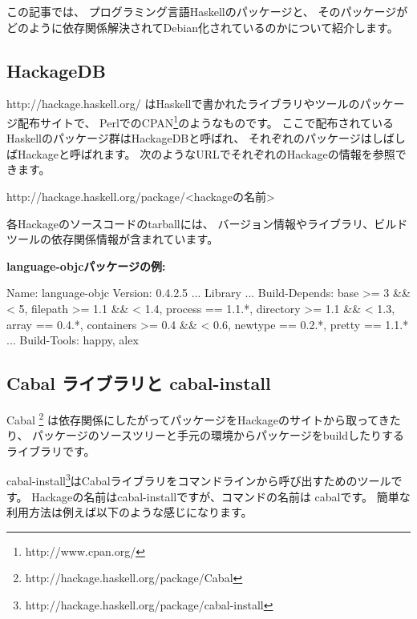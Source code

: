 この記事では、
プログラミング言語Haskellのパッケージと、
そのパッケージがどのように依存関係解決されてDebian化されているのかについて紹介します。


\subsection{HackageDB}

http://hackage.haskell.org/
はHaskellで書かれたライブラリやツールのパッケージ配布サイトで、
PerlでのCPAN{\footnote{http://www.cpan.org/}}のようなものです。
ここで配布されているHaskellのパッケージ群はHackageDBと呼ばれ、
それぞれのパッケージはしばしばHackageと呼ばれます。
次のようなURLでそれぞれのHackageの情報を参照できます。

\begin{commandline}
http://hackage.haskell.org/package/<hackageの名前>
\end{commandline}

各Hackageのソースコードのtarballには、
バージョン情報やライブラリ、ビルドツールの依存関係情報が含まれています。

{\bf language-objcパッケージの例:}

\begin{commandline}
Name:          language-objc
Version:       0.4.2.5
...
Library
...
    Build-Depends: base       >= 3 && < 5,
                   filepath   >= 1.1 && < 1.4,
                   process    == 1.1.*,
                   directory  >= 1.1 && < 1.3,
                   array      == 0.4.*,
                   containers >= 0.4     && < 0.6,
                   newtype    == 0.2.*,
                   pretty     == 1.1.*
...
    Build-Tools:    happy, alex
\end{commandline}

\subsection{Cabal ライブラリと cabal-install}

Cabal \footnote{http://hackage.haskell.org/package/Cabal} は依存関係にしたがってパッケージをHackageのサイトから取ってきたり、
パッケージのソースツリーと手元の環境からパッケージをbuildしたりするライブラリです。

cabal-install\footnote{http://hackage.haskell.org/package/cabal-install}はCabalライブラリをコマンドラインから呼び出すためのツールです。
Hackageの名前はcabal-installですが、コマンドの名前は cabalです。
簡単な利用方法は例えば以下のような感じになります。

